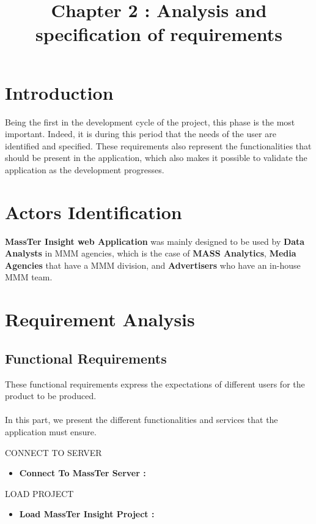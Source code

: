 \documentclass[12pt]{article}
\begin{document}
	\listoffigures
	\title{Chapter 2 : Analysis and specification of requirements}
	\maketitle
	
	\section{Introduction}
	Being the first in the development cycle of the project, this phase is the most
	important. Indeed, it is during this period that the needs of the user are identified and specified. These requirements also represent the functionalities that should be present in the application, which also makes it possible to validate the application as the development progresses.
	\section{Actors Identification}
	\textbf{MassTer Insight web Application }was mainly designed to be used by \textbf{Data Analysts }in MMM agencies, which is the case of \textbf{MASS Analytics}, \textbf{Media Agencies }that have a MMM division, and \textbf{Advertisers }who have an in-house MMM team.
	
	\clearpage
	\newpage
	
	
	\section{Requirement Analysis}

	\subsection{Functional Requirements}
     
	These functional requirements express the expectations of different users for the product to be produced.
	\\
	\\
	In this part, we present the different functionalities and services that the application must ensure.
	
	CONNECT TO SERVER
	\begin{itemize}
		\setlength{\itemindent}{+.5in}
		\item \textbf{Connect To MassTer Server : } 
	\end{itemize}
	
	LOAD PROJECT
	\begin{itemize}
		\setlength{\itemindent}{+.5in}
     	\item \textbf{Load MassTer Insight Project : } 
    \end{itemize}	
 
\end{document}

